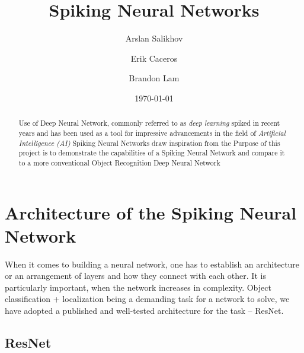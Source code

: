 \documentclass{article}
\title{Spiking Neural Networks}
\author{Arslan Salikhov  \\
	\and 
	Erik Caceros \\
	\and
	Brandon Lam \\
	}
\date{\today}
\begin{document}
\begin{titlingpage}
\maketitle
\begin{abstract}
	Use of Deep Neural Network, commonly referred to as
	\emph{deep learning} spiked in recent years and has been used
	as a tool for impressive advancements in the field of 
	\emph{Artificial Intelligence (AI)}
	Spiking Neural Networks draw inspiration from the 
	Purpose of this project is to demonstrate the capabilities of a 
	Spiking Neural Network and compare it to a more conventional 
	Object Recognition Deep Neural Network
	\end{abstract}
\end{titlingpage}


\tableofcontents
\newpage




\section{Architecture of the Spiking Neural Network}

When it comes to building a neural network, one has to establish an
architecture or an arrangement of layers and how they connect with each other.
It is particularly important, when the network increases in complexity. Object
classification + localization being a demanding task for a network to solve,
we have adopted a published and well-tested architecture for the task --
ResNet.

\subsection{ResNet}
\end{document}
